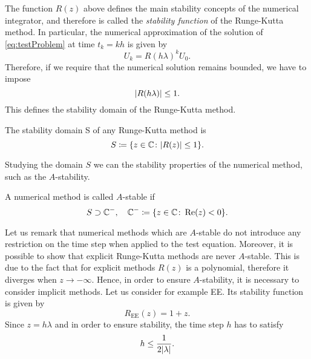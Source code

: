\noindent The function $R(z)$ above defines the main stability concepts of the numerical integrator, and therefore is called the \textit{stability function} of the Runge-Kutta method. In particular, the numerical approximation of the solution of \eqref{eq:testProblem} at time $t_k = kh$ is given by 
\begin{equation}
	U_k = R(h\lambda)^k U_0. 	
\end{equation}
Therefore, if we require that the numerical solution remains bounded, we have to impose 
\begin{equation}
	\abs{R(h\lambda)} \leq 1. 
\end{equation}
This defines the stability domain of the Runge-Kutta method.
\begin{definition} The stability domain S of any Runge-Kutta method is 
\begin{equation}
	S \coloneqq \{z \in \mathbb{C} \colon\abs{R(z)} \leq 1\}.
\end{equation}
\end{definition}
\noindent Studying the domain $S$ we can the stability properties of the numerical method, such as the $A$-stability.
\begin{definition} A numerical method is called $A$-stable if
\begin{equation}
	S \supset \mathbb{C}^{-}, \quad \mathbb{C}^{-} \coloneqq \{z\in\mathbb{C} \colon \Re(z) < 0\}.
\end{equation}
\end{definition}
\noindent Let us remark that numerical methods which are $A$-stable do not introduce any restriction on the time step when applied to the test equation. Moreover, it is possible to show that explicit Runge-Kutta methods are never $A$-stable. This is due to the fact that for explicit methods $R(z)$ is a polynomial, therefore it diverges when $z \to -\infty$. Hence, in order to ensure $A$-stability, it is necessary to consider implicit methods. Let us consider for example EE. Its stability function is given by
\begin{equation}
	R_{\mathrm{EE}}(z) = 1 + z. 
\end{equation} 
Since $z = h\lambda$ and in order to ensure stability, the time step $h$ has to satisfy
\begin{equation}\label{eq:EEhRestriction}
	h \leq \frac{1}{2\abs{\lambda}}.
\end{equation}
